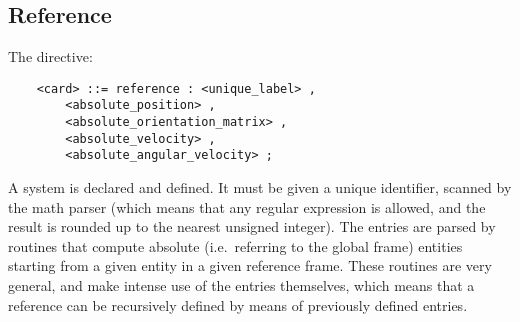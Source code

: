 \subsection{Reference}
The  directive:
\begin{verbatim}
    <card> ::= reference : <unique_label> , 
        <absolute_position> ,
        <absolute_orientation_matrix> ,
        <absolute_velocity> ,
        <absolute_angular_velocity> ;
\end{verbatim}
A  system is declared and defined.
It must be given a unique identifier, scanned by the math parser
(which means that any regular expression is allowed, and the result is
rounded up to the nearest unsigned integer).
The entries  are parsed by routines that
compute absolute (i.e.\ referring to the global frame) entities
starting from a given entity in a given reference frame.
These routines are very general, and make intense use of the 
 entries themselves, which means that a reference 
can be recursively defined by means of previously defined 
 entries.

